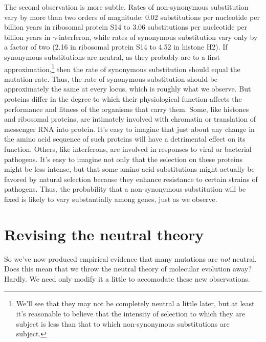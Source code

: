The second observation is more subtle. Rates of non-synonymous
substitution vary by more than two orders of magnitude: 0.02
substitutions per nucleotide per billion years in ribosomal protein
S14 to 3.06 substitutions per nucleotide per billion years in
$\gamma$-interferon, while rates of synonymous substitution vary only
by a factor of two (2.16 in ribosomal protein S14 to 4.52 in histone
H2). If synonymous substitutions are neutral, as they probably are to
a first approximation,\footnote{We'll see that they may not be
  completely neutral a little later, but at least it's reasonable to
  believe that the intensity of selection to which they are subject is
  less than that to which non-synonymous substitutions are subject.}
then the rate of synonymous substitution should equal the mutation
rate. Thus, the rate of synonymous substitution should be
approximately the same at every locus, which is roughly what we
observe. But proteins differ in the degree to which their
physiological function affects the performance and fitness of the
organisms that carry them. Some, like histones and ribosomal proteins,
are intimately involved with chromatin or translation of messenger RNA
into protein. It's easy to imagine that just about any change in the
amino acid sequence of such proteins will have a detrimental effect on
its function. Others, like interferons, are involved in responses to
viral or bacterial pathogens. It's easy to imagine not only that the
selection on these proteins might be less intense, but that some amino
acid substitutions might actually be favored by natural selection
because they enhance resistance to certain strains of pathogens. Thus,
the probability that a non-synonymous substitution will be fixed is
likely to vary substantially among genes, just as we observe.

\section*{Revising the neutral theory}

So we've now produced empirical evidence that many mutations are {\it
  not\/} neutral. Does this mean that we throw the neutral theory of
molecular evolution away? Hardly. We need only modify it a little to
accomodate these new observations.

